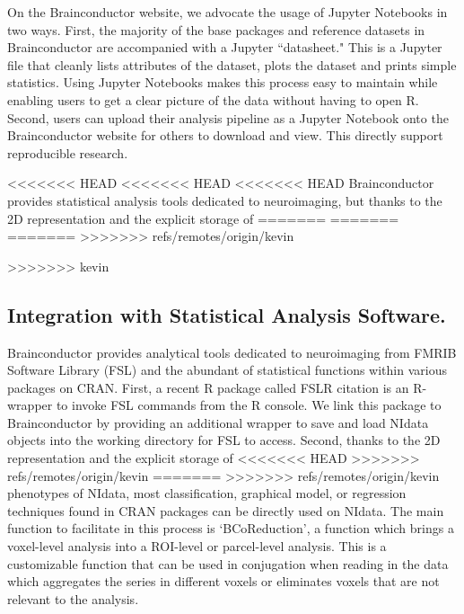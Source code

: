 \documentclass{nature}
\begin{document}
{On the Brainconductor website, we advocate the usage of Jupyter Notebooks
in two ways. First, the majority of the base packages and reference datasets
in Brainconductor are accompanied with a Jupyter ``datasheet." This is a
Jupyter file that cleanly lists attributes of the dataset, plots the dataset
and prints simple statistics. Using Jupyter Notebooks makes this process easy
to maintain while enabling users to get a clear picture of the data without
having to open R. Second, users can upload their analysis pipeline as a Jupyter
Notebook onto the Brainconductor website for others to download and view. This
directly support reproducible research.



<<<<<<< HEAD
<<<<<<< HEAD
<<<<<<< HEAD
Brainconductor provides statistical analysis tools dedicated to neuroimaging,
but thanks to the 2D representation and the explicit storage of
=======
=======
=======
>>>>>>> refs/remotes/origin/kevin

>>>>>>> kevin
\subsection{Integration with Statistical Analysis Software.}

Brainconductor provides analytical tools dedicated to neuroimaging from
FMRIB Software Library (FSL) and the abundant of statistical functions within
various packages on CRAN. 
First, a recent R package called FSLR {\color{red}citation} is an R-wrapper to invoke
FSL commands from the R console. We link this package to Brainconductor by providing
an additional wrapper to save and load NIdata objects into the working directory for
FSL to access.
Second, thanks to the 2D representation and the explicit storage of
<<<<<<< HEAD
>>>>>>> refs/remotes/origin/kevin
=======
>>>>>>> refs/remotes/origin/kevin
phenotypes of NIdata, most classification, graphical model, or regression
techniques
found in CRAN packages can be directly used on NIdata. The main function to
facilitate in this process is `BCoReduction', a function which brings a
voxel-level
analysis into a ROI-level or parcel-level analysis. This is a customizable
function
that can be used in conjugation when reading in the data which aggregates
the series
in different voxels or eliminates voxels that are not relevant to the analysis.

}
\end{document}
